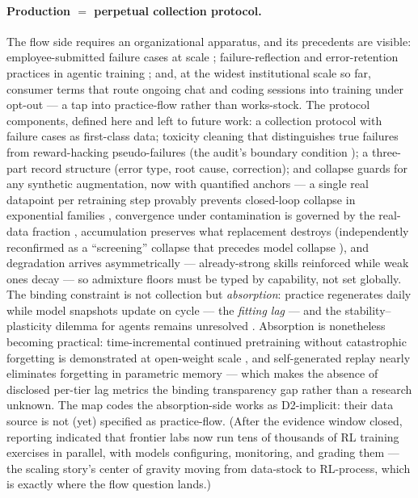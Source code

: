 \documentclass[10pt]{article}
\begin{document}
\paragraph{Production $=$ perpetual collection protocol.}
The flow side requires an organizational apparatus, and its precedents are visible: employee-submitted failure cases at scale \cite{deepseek2026v41}; failure-reflection and error-retention practices in agentic training \cite{xiaomi2026mimo, zai2026glm5}; and, at the widest institutional scale so far, consumer terms that route ongoing chat and coding sessions into training under opt-out \cite{anthropic2025consumerterms} --- a tap into practice-flow rather than works-stock. The protocol components, defined here and left to future work: a collection protocol with failure cases as first-class data; toxicity cleaning that distinguishes true failures from reward-hacking pseudo-failures (the audit's boundary condition \cite{yu2026failure}); a three-part record structure (error type, root cause, correction); and collapse guards for any synthetic augmentation, now with quantified anchors --- a single real datapoint per retraining step provably prevents closed-loop collapse in exponential families \cite{jangjoo2026lost}, convergence under contamination is governed by the real-data fraction \cite{wang2026guarantees}, accumulation preserves what replacement destroys (independently reconfirmed as a ``screening'' collapse that precedes model collapse \cite{zhang2026screening}), and degradation arrives asymmetrically --- already-strong skills reinforced while weak ones decay \cite{luo2026polarization} --- so admixture floors must be typed by capability, not set globally. The binding constraint is not collection but \emph{absorption}: practice regenerates daily while model snapshots update on cycle --- the \emph{fitting lag} --- and the stability--plasticity dilemma for agents remains unresolved \cite{wu2026agentdice}. Absorption is nonetheless becoming practical: time-incremental continued pretraining without catastrophic forgetting is demonstrated at open-weight scale \cite{oncel2026timeincremental}, and self-generated replay nearly eliminates forgetting in parametric memory \cite{marek2026replay} --- which makes the absence of disclosed per-tier lag metrics the binding transparency gap rather than a research unknown. The map codes the absorption-side works as D2-implicit: their data source is not (yet) specified as practice-flow. (After the evidence window closed, reporting indicated that frontier labs now run tens of thousands of RL training exercises in parallel, with models configuring, monitoring, and grading them \cite{nolan2026fortune} --- the scaling story's center of gravity moving from data-stock to RL-process, which is exactly where the flow question lands.)
\end{document}
